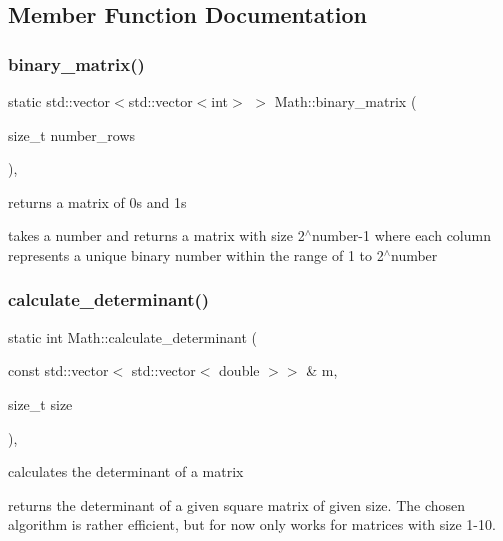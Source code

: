 \subsection{Member Function Documentation}
\mbox{\label{classMath_a59af3c9e62ca5318cc7cbb4de4d53709}} 
\subsubsection{\texorpdfstring{binary\+\_\+matrix()}{binary\_matrix()}}
{\footnotesize\ttfamily static std\+::vector$<$std\+::vector$<$int$>$ $>$ Math\+::binary\+\_\+matrix (\begin{DoxyParamCaption}\item[{size\+\_\+t}]{number\+\_\+rows }\end{DoxyParamCaption})\hspace{0.3cm}{\ttfamily [inline]}, {\ttfamily [static]}}



returns a matrix of 0s and 1s 

takes a number and returns a matrix with size 2$^\wedge$number-\/1 where each column represents a unique binary number within the range of 1 to 2$^\wedge$number \mbox{\label{classMath_a98e10539ebd03ed6705aee8e184da32b}} 
\subsubsection{\texorpdfstring{calculate\+\_\+determinant()}{calculate\_determinant()}}
{\footnotesize\ttfamily static int Math\+::calculate\+\_\+determinant (\begin{DoxyParamCaption}\item[{const std\+::vector$<$ std\+::vector$<$ double $>$$>$ \&}]{m,  }\item[{size\+\_\+t}]{size }\end{DoxyParamCaption})\hspace{0.3cm}{\ttfamily [inline]}, {\ttfamily [static]}}



calculates the determinant of a matrix 

returns the determinant of a given square matrix of given size. The chosen algorithm is rather efficient, but for now only works for matrices with size 1-\/10. \mbox{\label{classMath_ab5ce1f51bb8c302d966581c9a77f1d66}} 
